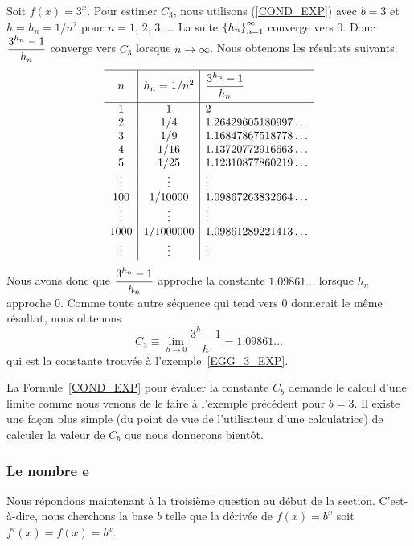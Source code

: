{\begin{egg}
Soit $f(x) = 3^x$.  Pour estimer $C_3$, nous utilisons (\ref{COND_EXP})
avec $b = 3$ et $h = h_n = 1/n^2$ pour $n=1$, $2$, $3$, \ldots
La suite $\displaystyle \left\{h_n\right\}_{n=1}^\infty$ converge vers
$0$.  Donc $\displaystyle \frac{3^{h_n}-1}{h_n}$ converge vers $C_3$
lorsque $n \to \infty$.  Nous obtenons les résultats suivants.
\[
\begin{array}{c|c|l}
\hline
\rule[-0.4em]{0ex}{1.5em} n & h_n = 1/n^2 &
\rule{0em}{1.7em} \DS \frac{3^{h_n}-1}{h_n} \\[0.8em]
\hline
1 & 1 & 2 \\
2 & 1/4 & 1.26429605180997\ldots \\
3 & 1/9 & 1.16847867518778\ldots \\
4 & 1/16 & 1.13720772916663\ldots \\
5 & 1/25 & 1.12310877860219\ldots \\
\vdots & \vdots & \vdots \\
100 & 1/10000 & 1.09867263832664\ldots \\
\vdots & \vdots & \vdots \\
1000 & 1/1000000 & 1.09861289221413\ldots \\
\vdots & \vdots & \vdots \\
\end{array}
\]
Nous avons donc que $\displaystyle \frac{3^{h_n}-1}{h_n}$ approche la constante
$1.09861\ldots$ lorsque $h_n$ approche $0$.  Comme toute autre
séquence qui tend vers $0$ donnerait le même résultat, nous obtenons
\[
C_3 \equiv \lim_{h\rightarrow 0} \frac{3^h-1}{h} = 1.09861\ldots
\]
qui est la constante trouvée à l'exemple~\ref{EGG_3_EXP}.
\label{COND_EXP_EGG}
\end{egg}

La Formule~\ref{COND_EXP} pour évaluer la constante $C_b$ demande le
calcul d'une limite comme nous venons de le faire à l'exemple précédent
pour $b=3$.  Il existe une façon plus simple (du point de vue de
l'utilisateur d'une calculatrice) de calculer la valeur de $C_b$ que
nous donnerons bientôt.

\subsubsection{Le nombre $\mathbf e$}

Nous répondons maintenant à la troisième question au début de la section.
C'est-à-dire, nous cherchons la base $b$ telle que la dérivée de
$f(x) = b^x$ soit $f'(x) = f(x) = b^x$.

}

